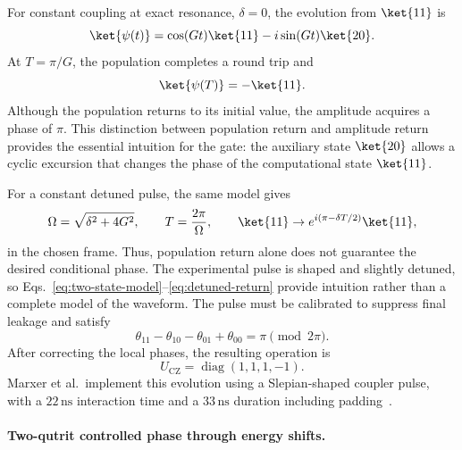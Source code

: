 For constant coupling at exact resonance, $\delta=0$, the
evolution from $\ket{11}$ is
\begin{equation}
    \ket{\psi(t)}
    = \cos(Gt)\ket{11}-i\sin(Gt)\ket{20}.
\end{equation}
At $T=\pi/G$, the population completes a round trip and
\begin{equation}
    \ket{\psi(T)}=-\ket{11}.
\end{equation}
Although the population returns to its initial value, the
amplitude acquires a phase of $\pi$. This distinction between
population return and amplitude return provides the essential
intuition for the gate: the auxiliary state $\ket{20}$ allows a
cyclic excursion that changes the phase of the computational
state $\ket{11}$.

For a constant detuned pulse, the same model gives
\begin{equation}
    \Omega=\sqrt{\delta^2+4G^2},
    \qquad
    T=\frac{2\pi}{\Omega},
    \qquad
    \ket{11}\rightarrow
    e^{i(\pi-\delta T/2)}\ket{11},
    \label{eq:detuned-return}
\end{equation}
in the chosen frame. Thus, population return alone does not
guarantee the desired conditional phase. The experimental pulse
is shaped and slightly detuned, so
Eqs.~\eqref{eq:two-state-model}--\eqref{eq:detuned-return}
provide intuition rather than a complete model of the waveform.
The pulse must be calibrated to suppress final leakage and
satisfy
\begin{equation}
    \theta_{11}-\theta_{10}-\theta_{01}+\theta_{00}
    =\pi \pmod{2\pi}.
\end{equation}
After correcting the local phases, the resulting operation is
\begin{equation}
    U_{\mathrm{CZ}}=\operatorname{diag}(1,1,1,-1).
\end{equation}
Marxer et al.\ implement this evolution using a Slepian-shaped
coupler pulse, with a $22\,\mathrm{ns}$ interaction time and a
$33\,\mathrm{ns}$ duration including padding~\cite{Marxer2023}.

\paragraph{Two-qutrit controlled phase through energy shifts.}

